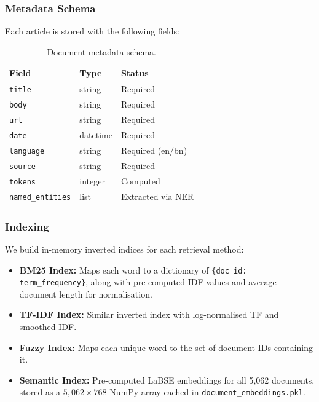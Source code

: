 \documentclass[12pt,a4paper]{article}
\begin{document}
\subsubsection{Metadata Schema}

Each article is stored with the following fields:

\begin{table}[H]
\centering
\caption{Document metadata schema.}
\begin{tabular}{lll}
\toprule
\textbf{Field} & \textbf{Type} & \textbf{Status} \\
\midrule
\texttt{title}       & string   & Required \\
\texttt{body}        & string   & Required \\
\texttt{url}         & string   & Required \\
\texttt{date}        & datetime & Required \\
\texttt{language}    & string   & Required (en/bn) \\
\texttt{source}      & string   & Required \\
\texttt{tokens}      & integer  & Computed \\
\texttt{named\_entities} & list  & Extracted via NER \\
\bottomrule
\end{tabular}
\end{table}

\subsubsection{Indexing}

We build in-memory inverted indices for each retrieval method:

\begin{itemize}
    \item \textbf{BM25 Index:} Maps each word to a dictionary of \texttt{\{doc\_id: term\_frequency\}}, along with pre-computed IDF values and average document length for normalisation.
    \item \textbf{TF-IDF Index:} Similar inverted index with log-normalised TF and smoothed IDF.
    \item \textbf{Fuzzy Index:} Maps each unique word to the set of document IDs containing it.
    \item \textbf{Semantic Index:} Pre-computed LaBSE embeddings for all 5{,}062 documents, stored as a $5{,}062 \times 768$ NumPy array cached in \texttt{document\_embeddings.pkl}.
\end{itemize}
\end{document}
